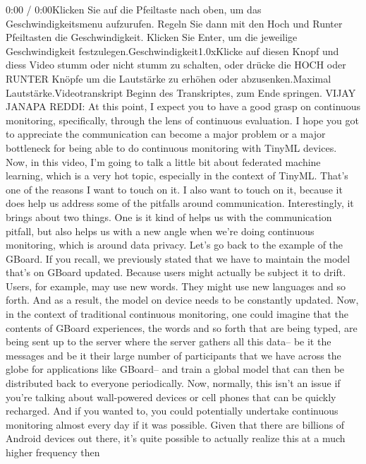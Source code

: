 {{{{{{{{{    0:00 / 0:00Klicken Sie auf die Pfeiltaste nach oben, um das Geschwindigkeitsmenu aufzurufen. Regeln Sie dann mit den Hoch und Runter Pfeiltasten die Geschwindigkeit. Klicken Sie Enter, um die jeweilige Geschwindigkeit festzulegen.Geschwindigkeit1.0xKlicke auf diesen Knopf und diess Video stumm oder nicht stumm zu schalten, oder drücke die HOCH oder RUNTER Knöpfe um die Lautstärke zu erhöhen oder abzusenken.Maximal Lautstärke.Videotranskript
    Beginn des Transkriptes, zum Ende springen.
    VIJAY JANAPA REDDI: At this point, I expect
    you to have a good grasp on continuous monitoring, specifically,
    through the lens of continuous evaluation.
    I hope you got to appreciate the communication can become
    a major problem or a major bottleneck for being
    able to do continuous monitoring with TinyML devices.
    Now, in this video, I'm going to talk a little bit about federated machine
    learning, which is a very hot topic, especially in the context of TinyML.
    That's one of the reasons I want to touch on it.
    I also want to touch on it, because it does help us address some
    of the pitfalls around communication.
    Interestingly, it brings about two things.
    One is it kind of helps us with the communication pitfall,
    but also helps us with a new angle when we're
    doing continuous monitoring, which is around data privacy.
    Let's go back to the example of the GBoard.
    If you recall, we previously stated that we
    have to maintain the model that's on GBoard updated.
    Because users might actually be subject it to drift.
    Users, for example, may use new words.
    They might use new languages and so forth.
    And as a result, the model on device needs to be constantly updated.
    Now, in the context of traditional continuous monitoring,
    one could imagine that the contents of GBoard experiences,
    the words and so forth that are being typed,
    are being sent up to the server where the server gathers all this data--
    be it the messages and be it their large number of participants
    that we have across the globe for applications like GBoard--
    and train a global model that can then be distributed back
    to everyone periodically.
    Now, normally, this isn't an issue if you're
    talking about wall-powered devices or cell
    phones that can be quickly recharged.
    And if you wanted to, you could potentially
    undertake continuous monitoring almost every day if it was possible.
    Given that there are billions of Android devices out there,
    it's quite possible to actually realize this at a much higher frequency then
}}}}}}}}}
